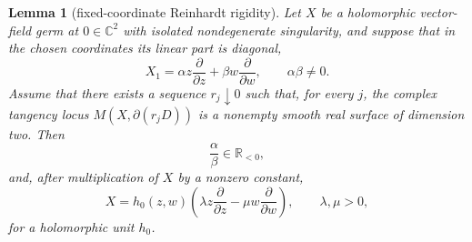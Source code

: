 \documentclass[10pt,a4paper]{amsart}
\newtheorem{lemma}{Lemma}
\newcommand{\C}{\mathbb C}
\newcommand{\R}{\mathbb R}
\newcommand{\pd}{\partial}
\begin{document}
\begin{lemma}[fixed-coordinate Reinhardt rigidity]\label{lem:reinhardt-rigidity}
Let $X$ be a holomorphic vector-field germ at $0\in\C^2$ with isolated nondegenerate singularity, and suppose that in the chosen coordinates its linear part is diagonal,
\[
 X_1=\alpha z\frac{\pd}{\pd z}+\beta w\frac{\pd}{\pd w},
 \qquad \alpha\beta\ne0.
\]
Assume that there exists a sequence $r_j\downarrow0$ such that, for every $j$, the complex tangency locus $M(X,\partial(r_jD))$ is a nonempty smooth real surface of dimension two. Then
\[
 \frac{\alpha}{\beta}\in\R_{<0},
\]
and, after multiplication of $X$ by a nonzero constant,
\[
 X=h_0(z,w)\left(
 \lambda z\frac{\pd}{\pd z}-\mu w\frac{\pd}{\pd w}
 \right),
 \qquad \lambda,\mu>0,
\]
for a holomorphic unit $h_0$.
\end{lemma}
\end{document}
